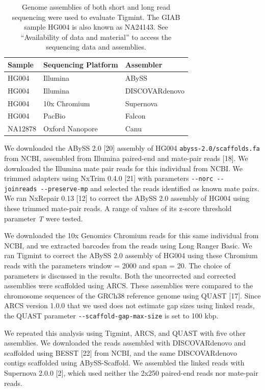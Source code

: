 \documentclass{bmcart}
\begin{document}
\begin{table}[!htbp]
\hypertarget{tbl:data}{}
\begin{tabular}{@{}lll@{}}
\toprule
Sample & Sequencing Platform & Assembler\tabularnewline
\midrule
HG004 & Illumina & ABySS\tabularnewline
HG004 & Illumina & DISCOVARdenovo\tabularnewline
HG004 & 10x Chromium & Supernova\tabularnewline
HG004 & PacBio & Falcon\tabularnewline
NA12878 & Oxford Nanopore & Canu\tabularnewline
\bottomrule
\end{tabular}
\caption{\label{tbl:data}Genome assemblies of both short and long read sequencing were used to evaluate Tigmint. The GIAB sample HG004 is also known as NA24143. See ``Availability of data and material'' to access the sequencing data and assemblies.}\tabularnewline
\end{table}

We downloaded the ABySS 2.0 {[}20{]} assembly of HG004 \texttt{abyss-2.0/scaffolds.fa} from NCBI, assembled from Illumina paired-end and mate-pair reads {[}18{]}. We downloaded the Illumina mate pair reads for this individual from NCBI. We trimmed adapters using NxTrim 0.4.0 {[}21{]} with parameters \texttt{-\/-norc\ -\/-joinreads\ -\/-preserve-mp} and selected the reads identified as known mate pairs. We ran NxRepair 0.13 {[}12{]} to correct the ABySS 2.0 assembly of HG004 using these trimmed mate-pair reads. A range of values of its z-score threshold parameter \emph{T} were tested.

We downloaded the 10x Genomics Chromium reads for this same individual from NCBI, and we extracted barcodes from the reads using Long Ranger Basic. We ran Tigmint to correct the ABySS 2.0 assembly of HG004 using these Chromium reads with the parameters window = 2000 and span = 20. The choice of parameters is discussed in the results. Both the uncorrected and corrected assemblies were scaffolded using ARCS. These assemblies were compared to the chromosome sequences of the GRCh38 reference genome using QUAST {[}17{]}. Since ARCS version 1.0.0 that we used does not estimate gap sizes using linked reads, the QUAST parameter \texttt{-\/-scaffold-gap-max-size} is set to 100 kbp.

We repeated this analysis using Tigmint, ARCS, and QUAST with five other assemblies. We downloaded the reads assembled with DISCOVARdenovo and scaffolded using BESST {[}22{]} from NCBI, and the same DISCOVARdenovo contigs scaffolded using ABySS-Scaffold. We assembled the linked reads with Supernova 2.0.0 {[}2{]}, which used neither the 2x250 paired-end reads nor mate-pair reads.
\end{document}
